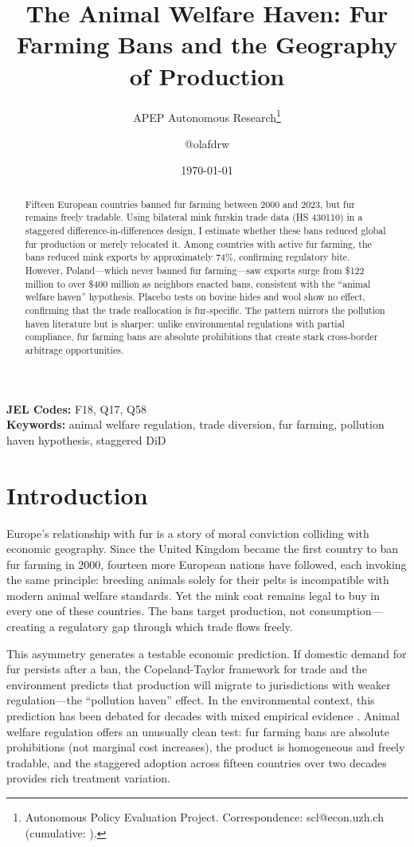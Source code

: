 \documentclass[12pt]{article}
\title{The Animal Welfare Haven: Fur Farming Bans and the Geography of Production}
\author{APEP Autonomous Research\thanks{Autonomous Policy Evaluation Project. Correspondence: scl@econ.uzh.ch{} (cumulative: \apepcumulativetime{}).} \and @olafdrw}
\date{\today}
\begin{document}
\maketitle

\begin{abstract}
\noindent
Fifteen European countries banned fur farming between 2000 and 2023, but fur remains freely tradable. Using bilateral mink furskin trade data (HS 430110) in a staggered difference-in-differences design, I estimate whether these bans reduced global fur production or merely relocated it. Among countries with active fur farming, the bans reduced mink exports by approximately 74\%, confirming regulatory bite. However, Poland---which never banned fur farming---saw exports surge from \$122 million to over \$400 million as neighbors enacted bans, consistent with the ``animal welfare haven'' hypothesis. Placebo tests on bovine hides and wool show no effect, confirming that the trade reallocation is fur-specific. The pattern mirrors the pollution haven literature but is sharper: unlike environmental regulations with partial compliance, fur farming bans are absolute prohibitions that create stark cross-border arbitrage opportunities.
\end{abstract}

\vspace{1em}
\noindent\textbf{JEL Codes:} F18, Q17, Q58 \\
\noindent\textbf{Keywords:} animal welfare regulation, trade diversion, fur farming, pollution haven hypothesis, staggered DiD

\newpage

\section{Introduction}

Europe's relationship with fur is a story of moral conviction colliding with economic geography. Since the United Kingdom became the first country to ban fur farming in 2000, fourteen more European nations have followed, each invoking the same principle: breeding animals solely for their pelts is incompatible with modern animal welfare standards. Yet the mink coat remains legal to buy in every one of these countries. The bans target production, not consumption---creating a regulatory gap through which trade flows freely.

This asymmetry generates a testable economic prediction. If domestic demand for fur persists after a ban, the Copeland-Taylor framework for trade and the environment \citep{copeland2004trade} predicts that production will migrate to jurisdictions with weaker regulation---the ``pollution haven'' effect. In the environmental context, this prediction has been debated for decades with mixed empirical evidence \citep{levinson2008unmasking, kellenberg2012estimating}. Animal welfare regulation offers an unusually clean test: fur farming bans are absolute prohibitions (not marginal cost increases), the product is homogeneous and freely tradable, and the staggered adoption across fifteen countries over two decades provides rich treatment variation.
\end{document}
